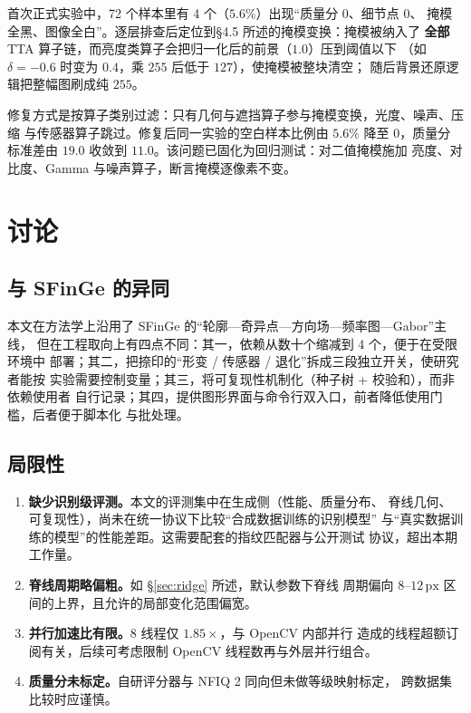 \documentclass[UTF8, fontset=windows, a4paper, 11pt]{ctexart}
\newcommand{\px}{\,\mathrm{px}}
\begin{document}
首次正式实验中，72 个样本里有 4 个（$5.6\%$）出现``质量分 $0$、细节点 $0$、
掩模全黑、图像全白''。逐层排查后定位到\S 4.5 所述的掩模变换：掩模被纳入了
\textbf{全部} TTA 算子链，而亮度类算子会把归一化后的前景（$1.0$）压到阈值以下
（如 $\delta=-0.6$ 时变为 $0.4$，乘 $255$ 后低于 $127$），使掩模被整块清空；
随后背景还原逻辑把整幅图刷成纯 $255$。

修复方式是按算子类别过滤：只有几何与遮挡算子参与掩模变换，光度、噪声、压缩
与传感器算子跳过。修复后同一实验的空白样本比例由 $5.6\%$ 降至 $0$，质量分
标准差由 $19.0$ 收敛到 $11.0$。该问题已固化为回归测试：对二值掩模施加
亮度、对比度、Gamma 与噪声算子，断言掩模逐像素不变。

\section{讨论}

\subsection{与 SFinGe 的异同}

本文在方法学上沿用了 SFinGe 的``轮廓—奇异点—方向场—频率图—Gabor''主线，
但在工程取向上有四点不同：其一，依赖从数十个缩减到 4 个，便于在受限环境中
部署；其二，把捺印的``形变 / 传感器 / 退化''拆成三段独立开关，使研究者能按
实验需要控制变量；其三，将可复现性机制化（种子树 + 校验和），而非依赖使用者
自行记录；其四，提供图形界面与命令行双入口，前者降低使用门槛，后者便于脚本化
与批处理。

\subsection{局限性}

\begin{enumerate}
    \item \textbf{缺少识别级评测。}本文的评测集中在生成侧（性能、质量分布、
          脊线几何、可复现性），尚未在统一协议下比较``合成数据训练的识别模型''
          与``真实数据训练的模型''的性能差距。这需要配套的指纹匹配器与公开测试
          协议，超出本期工作量。
    \item \textbf{脊线周期略偏粗。}如 \S\ref{sec:ridge} 所述，默认参数下脊线
          周期偏向 $8$--$12\px$ 区间的上界，且允许的局部变化范围偏宽。
    \item \textbf{并行加速比有限。}8 线程仅 $1.85\times$，与 OpenCV 内部并行
          造成的线程超额订阅有关，后续可考虑限制 OpenCV 线程数再与外层并行组合。
    \item \textbf{质量分未标定。}自研评分器与 NFIQ 2 同向但未做等级映射标定，
          跨数据集比较时应谨慎。
\end{enumerate}
\end{document}
